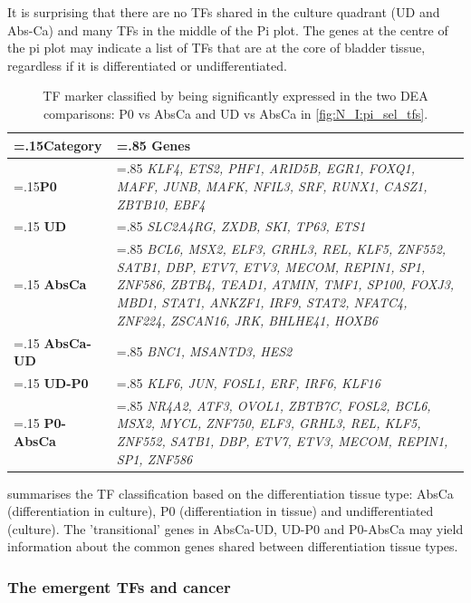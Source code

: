 It is surprising that there are no TFs shared in the culture quadrant (UD and Abs-Ca) and many TFs in the middle of the Pi plot. The genes at the centre of the pi plot may indicate a list of TFs that are at the core of bladder tissue, regardless if it is differentiated or undifferentiated.

\begin{table}[H]
  \centering
  \scriptsize
  \begin{tabularx}{\textwidth}{>{\hsize=.15\hsize}X|>{\hsize=.85\hsize}X}
    \toprule
    \textbf{Category} & \textbf{Genes} \\
    \midrule
    \textbf{P0} & \textit{KLF4, ETS2, PHF1, ARID5B, EGR1, FOXQ1, MAFF, JUNB, MAFK, NFIL3, SRF, RUNX1, CASZ1, ZBTB10, EBF4} \\
    \midrule
    \textbf{UD} & \textit{SLC2A4RG, ZXDB, SKI, TP63, ETS1} \\
    \midrule
    \textbf{AbsCa} & \textit{BCL6, MSX2, ELF3, GRHL3, REL, KLF5, ZNF552, SATB1, DBP, ETV7, ETV3, MECOM, REPIN1, SP1, ZNF586, ZBTB4, TEAD1, ATMIN, TMF1, SP100, FOXJ3, MBD1, STAT1, ANKZF1, IRF9, STAT2, NFATC4, ZNF224, ZSCAN16, JRK, BHLHE41, HOXB6} \\
    \midrule
    \textbf{AbsCa-UD} & \textit{BNC1, MSANTD3, HES2} \\
    \midrule
    \textbf{UD-P0} & \textit{KLF6, JUN, FOSL1, ERF, IRF6, KLF16} \\
    \midrule
    \textbf{P0-AbsCa} & \textit{NR4A2, ATF3, OVOL1, ZBTB7C, FOSL2, BCL6, MSX2, MYCL, ZNF750, ELF3, GRHL3, REL, KLF5, ZNF552, SATB1, DBP, ETV7, ETV3, MECOM, REPIN1, SP1, ZNF586} \\
    \bottomrule
  \end{tabularx}
  \caption{TF marker classified by being significantly expressed in the two DEA comparisons: P0 vs AbsCa and UD vs AbsCa in \cref{fig:N_I:pi_sel_tfs}.} 
  \label{tab:N_I:markers_diff}
\end{table}

 summarises the TF classification based on the differentiation tissue type: AbsCa (differentiation in culture), P0 (differentiation in tissue) and undifferentiated (culture). The 'transitional' genes in AbsCa-UD, UD-P0 and P0-AbsCa may yield information about the common genes shared between differentiation tissue types.


\subsubsection*{The emergent TFs and cancer} \label{s:N_I:sel_tfs_cancer}


